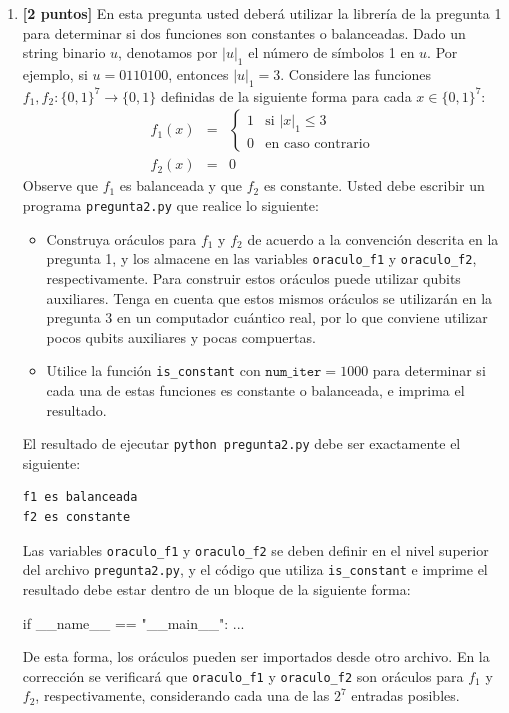 \documentclass[10pt]{article}
\begin{document}
\begin{enumerate}
\item {\bf [2 puntos]} En esta pregunta usted deberá utilizar la librería de la pregunta 1 para
  determinar si dos funciones son constantes o balanceadas. Dado un string binario $u$, denotamos
  por $|u|_1$ el número de símbolos 1 en $u$. Por ejemplo, si $u = 0110100$, entonces $|u|_1 = 3$.
  Considere las funciones $f_1, f_2 : \{0,1\}^7 \to \{0,1\}$ definidas de la siguiente forma para
  cada $x \in \{0,1\}^7$:
  \begin{eqnarray*}
    f_1(x) & = & \begin{cases}
      1 & \text{si } |x|_1 \leq 3\\
      0 & \text{en caso contrario}
    \end{cases}\\
    f_2(x) & = & 0
  \end{eqnarray*}
  Observe que $f_1$ es balanceada y que $f_2$ es constante.
  Usted debe escribir un programa \texttt{pregunta2.py} que realice lo siguiente:
  \begin{itemize}
  \item Construya oráculos para $f_1$ y $f_2$ de acuerdo a la convención descrita en la
    pregunta 1, y los almacene en las variables \texttt{oraculo\_f1} y \texttt{oraculo\_f2},
    respectivamente. Para construir estos oráculos puede utilizar qubits auxiliares. Tenga en
    cuenta que estos mismos oráculos se utilizarán en la pregunta 3 en un computador cuántico real,
    por lo que conviene utilizar pocos qubits auxiliares y pocas compuertas.
  \item Utilice la función \texttt{is\_constant} con $\texttt{num\_iter} = 1000$ para determinar si
    cada una de estas funciones es constante o balanceada, e imprima el resultado.
  \end{itemize}
  El resultado de ejecutar \texttt{python pregunta2.py} debe ser exactamente el siguiente:
{\small
\begin{verbatim}
f1 es balanceada
f2 es constante
\end{verbatim}
}
  Las variables \texttt{oraculo\_f1} y \texttt{oraculo\_f2} se deben definir en el nivel superior
  del archivo \texttt{pregunta2.py}, y el código que utiliza \texttt{is\_constant} e
  imprime el resultado debe estar dentro de un bloque de la siguiente forma:
\begin{python}
if __name__ == "__main__":
    ...
\end{python}
  De esta forma, los oráculos pueden ser importados desde otro archivo. En la corrección se
  verificará que \texttt{oraculo\_f1} y \texttt{oraculo\_f2} son oráculos para $f_1$ y $f_2$,
  respectivamente, considerando cada una de las $2^7$ entradas posibles.


\end{enumerate}
\end{document}
